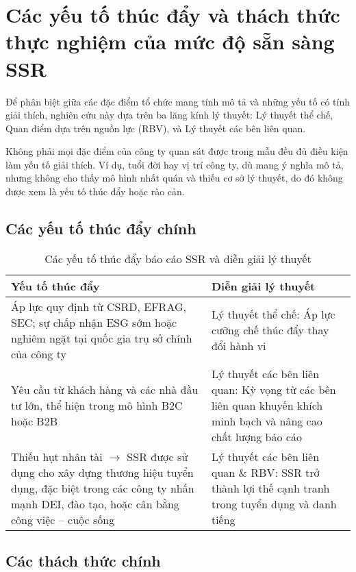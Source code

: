 \section{Các yếu tố thúc đẩy và thách thức thực nghiệm của mức độ sẵn sàng SSR}
Để phân biệt giữa các đặc điểm tổ chức mang tính mô tả và những yếu tố có tính giải thích, nghiên cứu này dựa trên ba lăng kính lý thuyết: Lý thuyết thể chế, Quan điểm dựa trên nguồn lực (RBV), và Lý thuyết các bên liên quan.

Không phải mọi đặc điểm của công ty quan sát được trong mẫu đều đủ điều kiện làm yếu tố giải thích.
Ví dụ, tuổi đời hay vị trí công ty, dù mang ý nghĩa mô tả, nhưng không cho thấy mô hình nhất quán và thiếu cơ sở lý thuyết, do đó không được xem là yếu tố thúc đẩy hoặc rào cản.

\subsection{Các yếu tố thúc đẩy chính}

\begin{table}[H]
\centering
\caption{Các yếu tố thúc đẩy báo cáo SSR và diễn giải lý thuyết}
\begin{tabular}{p{6cm}|p{8cm}}
\textbf{Yếu tố thúc đẩy} & \textbf{Diễn giải lý thuyết} \\
\hline
Áp lực quy định từ CSRD, EFRAG, SEC; sự chấp nhận ESG sớm hoặc nghiêm ngặt tại quốc gia trụ sở chính của công ty
& Lý thuyết thể chế: Áp lực cưỡng chế thúc đẩy thay đổi hành vi \\
\hline
Yêu cầu từ khách hàng và các nhà đầu tư lớn, thể hiện trong mô hình B2C hoặc B2B
& Lý thuyết các bên liên quan: Kỳ vọng từ các bên liên quan khuyến khích minh bạch và nâng cao chất lượng báo cáo \\
\hline
Thiếu hụt nhân tài $\rightarrow$ SSR được sử dụng cho xây dựng thương hiệu tuyển dụng, đặc biệt trong các công ty nhấn mạnh DEI, đào tạo, hoặc cân bằng công việc – cuộc sống
& Lý thuyết các bên liên quan \& RBV: SSR trở thành lợi thế cạnh tranh trong tuyển dụng và danh tiếng \\
\end{tabular}
\end{table}

\subsection{Các thách thức chính}

